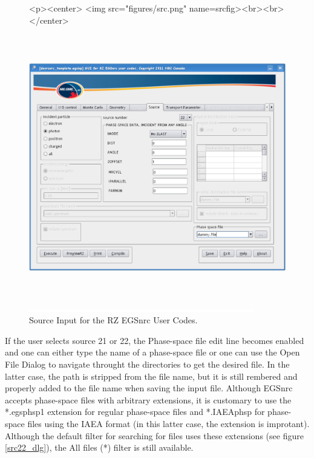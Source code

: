 \documentclass[12pt,twoside]{article}   %
\begin{document}
\begin{figure}[htb]
\begin{htmlonly}
\begin{rawhtml}
<p><center>
<img src="figures/src.png" name=srcfig><br><br>
</center>
\end{rawhtml}
\end{htmlonly}
\begin{latexonly}
\begin{center}
\includegraphics[height=11.56cm]{figures/src}
\end{center}
\end{latexonly}
\begin{center}
\includegraphics[height=1mm]{figures/fake2}
\end{center}
\caption{Source Input for the RZ EGSnrc User Codes.}
\label{srcfig}
\end{figure}

If the user selects source 21 or 22, 
the Phase-space file edit line becomes
enabled and one can either type the name 
of a phase-space file or one can use the Open File Dialog
to navigate throught the directories to get the desired file.
In the latter case, the path is stripped from the file name,
but it is still rembered and properly added to the file name
when saving the input file. Although EGSnrc accepts phase-space files
with arbitrary extensions, it is customary to use the *.egsphsp1
extension for regular phase-space files and *.IAEAphsp for phase-space
files using the IAEA format (in this latter case, the extension is improtant). 
Although the default filter for searching for files uses these
extensions (see figure \ref{src22_dlg}), the All files (*) filter is still available.
\end{document}
